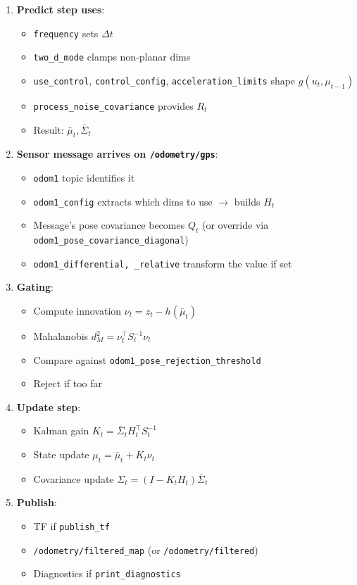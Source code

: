 \documentclass[11pt,a4paper]{article}
\begin{document}
\begin{enumerate}
\item \textbf{Predict step uses}:
\begin{itemize}
\item \texttt{frequency} sets $\Delta t$
\item \texttt{two\_d\_mode} clamps non-planar dims
\item \texttt{use\_control}, \texttt{control\_config}, \texttt{acceleration\_limits} shape $g(u_t, \mu_{t-1})$
\item \texttt{process\_noise\_covariance} provides $R_t$
\item Result: $\bar{\mu}_t, \bar{\Sigma}_t$
\end{itemize}

\item \textbf{Sensor message arrives on \texttt{/odometry/gps}}:
\begin{itemize}
\item \texttt{odom1} topic identifies it
\item \texttt{odom1\_config} extracts which dims to use $\to$ builds $H_t$
\item Message's pose covariance becomes $Q_t$ (or override via \texttt{odom1\_pose\_covariance\_diagonal})
\item \texttt{odom1\_differential, \_relative} transform the value if set
\end{itemize}

\item \textbf{Gating}:
\begin{itemize}
\item Compute innovation $\nu_t = z_t - h(\bar{\mu}_t)$
\item Mahalanobis $d_M^2 = \nu_t^\top S_t^{-1} \nu_t$
\item Compare against \texttt{odom1\_pose\_rejection\_threshold}
\item Reject if too far
\end{itemize}

\item \textbf{Update step}:
\begin{itemize}
\item Kalman gain $K_t = \bar{\Sigma}_t H_t^\top S_t^{-1}$
\item State update $\mu_t = \bar{\mu}_t + K_t \nu_t$
\item Covariance update $\Sigma_t = (I - K_t H_t) \bar{\Sigma}_t$
\end{itemize}

\item \textbf{Publish}:
\begin{itemize}
\item TF if \texttt{publish\_tf}
\item \texttt{/odometry/filtered\_map} (or \texttt{/odometry/filtered})
\item Diagnostics if \texttt{print\_diagnostics}
\end{itemize}
\end{enumerate}
\end{document}
